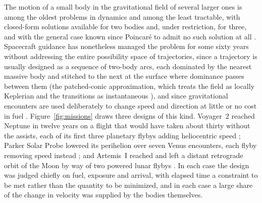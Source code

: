 \documentclass[11pt]{article}
\begin{document}
The motion of a small body in the gravitational field of several larger ones
is among the oldest problems in dynamics and among the least tractable, with
closed-form solutions available for two bodies and, under restriction, for
three, and with the general case known since Poincar\'e to admit no such
solution at all \cite{poincare1890,szebehely1967,henon1964}. Spacecraft
guidance has nonetheless managed the problem for some sixty years without
addressing the entire possibility space of trajectories, since a trajectory
is usually designed as a sequence of two-body arcs, each dominated by the
nearest massive body and stitched to the next at the surface where dominance
passes between them (the patched-conic approximation, which treats the field
as locally Keplerian and the transitions as instantaneous
\cite{bate1971,battin1999,hill1878}), and since gravitational encounters are
used deliberately to change speed and direction at little or no cost in fuel
\cite{flandro1966}. Figure~\ref{fig:missions} draws three designs of this
kind. Voyager~2 reached Neptune in twelve years on a flight that would have
taken about thirty without the assists, each of its first three planetary
flybys adding heliocentric speed \cite{kohlhase1977,nasa_voyager_voyage}; Parker Solar Probe lowered its perihelion over seven
Venus encounters, each flyby removing speed instead \cite{fox2016,guo2010};
and Artemis~I reached and left a distant retrograde orbit of the Moon by way
of two powered lunar flybys \cite{batcha2020}. In each case the design was
judged chiefly on fuel, exposure and arrival, with elapsed time a constraint
to be met rather than the quantity to be minimized, and in each case a large
share of the change in velocity was supplied by the bodies themselves.
\end{document}
